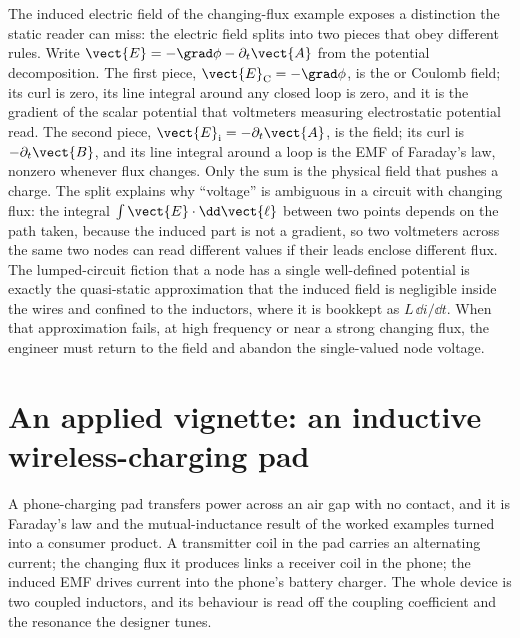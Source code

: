 \begin{mastery}
The induced electric field of the changing-flux example exposes a
distinction the static reader can miss: the electric field splits into two
pieces that obey different rules. Write $\vect{E} = -\grad\phi -
\partial_t\vect{A}$ from the potential decomposition. The first piece,
$\vect{E}_{\text{C}} = -\grad\phi$, is the  or
Coulomb field; its curl is zero, its line integral around any closed loop
is zero, and it is the gradient of the scalar potential that voltmeters
measuring electrostatic potential read. The second piece,
$\vect{E}_{\text{i}} = -\partial_t\vect{A}$, is the 
field; its curl is $-\partial_t\vect{B}$, and its line integral around a
loop is the EMF of Faraday's law, nonzero whenever flux changes. Only the
sum is the physical field that pushes a charge. The split explains why
``voltage'' is ambiguous in a circuit with changing flux: the integral
$\int\vect{E}\cdot\dd\vect{\ell}$ between two points depends on the path
taken, because the induced part is not a gradient, so two voltmeters
across the same two nodes can read different values if their leads enclose
different flux. The lumped-circuit fiction that a node has a single
well-defined potential is exactly the quasi-static approximation that the
induced field is negligible inside the wires and confined to the
inductors, where it is bookkept as $L\,\dd i/\dd t$. When that
approximation fails, at high frequency or near a strong changing flux, the
engineer must return to the field and abandon the single-valued node
voltage.
\end{mastery}

\section{An applied vignette: an inductive wireless-charging pad}

A phone-charging pad transfers power across an air gap with no contact,
and it is Faraday's law and the mutual-inductance result of the worked
examples turned into a consumer product. A transmitter coil in the pad
carries an alternating current; the changing flux it produces links a
receiver coil in the phone; the induced EMF drives current into the
phone's battery charger. The whole device is two coupled inductors, and
its behaviour is read off the coupling coefficient and the resonance the
designer tunes.

